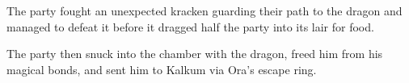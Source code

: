 The party fought an unexpected kracken guarding their path to the dragon and managed to defeat it before it dragged half the party into its lair for food.

The party then snuck into the chamber with the dragon, freed him from his magical bonds, and sent him to Kalkum via Ora's escape ring.